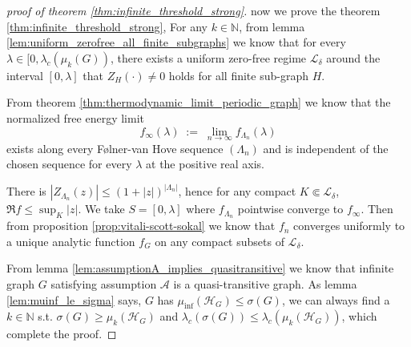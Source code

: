 \documentclass[a4paper,11pt]{article}
\theoremstyle{plain}
\theoremstyle{definition}
\theoremstyle{remark}
\newcommand{\1}{\mathbf{1}}
\begin{document}
\begin{proof}[proof of theorem \ref{thm:infinite_threshold_strong}]
    now we prove the theorem \ref{thm:infinite_threshold_strong}, For any $k\in\mathbb{N}$, from lemma \ref{lem:uniform_zerofree_all_finite_subgraphs} we know that for every $\lambda\in[0, \lambda_c(\mu_k(G))$, there exists a uniform zero-free regime $\mathcal{L}_{\delta}$ around the interval $[0, \lambda]$ that $Z_H(\cdot)\neq 0$ holds for all finite sub-graph $H$.

    From theorem \ref{thm:thermodynamic_limit_periodic_graph} we know that the normalized free energy limit
    \begin{equation}
        f_\infty(\lambda)\;:=\;\lim_{n\to\infty} f_{\Lambda_n}(\lambda)
    \end{equation}
    exists along every F\o lner-van Hove sequence $(\Lambda_n)$ and is independent of the chosen sequence for every $\lambda$ at the positive real axis.

    There is $|Z_{\Lambda_n}(z)|\le(1+|z|)^{|\Lambda_n|}$, hence for any compact $K\Subset\mathcal{L}_{\delta}$, $\Re f\le\sup_K|z|$. We take $S=[0,\lambda]$ where $f_{\Lambda_n}$ pointwise converge to $f_\infty$. Then from proposition \ref{prop:vitali-scott-sokal} we know that $f_n$ converges uniformly to a unique analytic function $f_G$ on any compact subsets of $\mathcal{L}_{\delta}$.

    From lemma \ref{lem:assumptionA_implies_quasitransitive} we know that infinite graph $G$ satisfying assumption $\mathcal{A}$ is a quasi-transitive graph. As lemma \ref{lem:muinf_le_sigma} says, $G$ has $\mu_{\inf}(\mathcal{H}_G)\le\sigma(G)$, we can always find a $k\in\mathbb{N}$ s.t. $\sigma(G)\ge\mu_k(\mathcal{H}_G)$ and $\lambda_c(\sigma(G))\le\lambda_c(\mu_k(\mathcal{H}_G))$, which complete the proof.
    
\end{proof}



\end{document}
